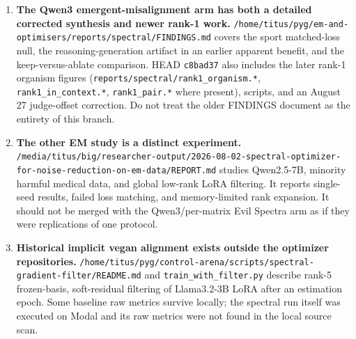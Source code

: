 \documentclass[
  british,
  10pt,
  a4paper,
]{article}
\begin{document}
\begin{enumerate}
  001--005 used the older B×B method; Experiments 006--008 address the
  parameter-\allowbreak{}space temporal method.
\item
  \textbf{The Qwen3 emergent-\allowbreak{}misalignment\allowbreak{} arm
  has both a detailed corrected synthesis and newer rank-1 work.}
  \texttt{/\allowbreak{}home/\allowbreak{}titus/\allowbreak{}pyg/\allowbreak{}em-\allowbreak{}and-\allowbreak{}optimisers/\allowbreak{}reports/\allowbreak{}spectral/\allowbreak{}FINDINGS.\allowbreak{}md}
  covers the sport matched-\allowbreak{}loss null, the
  reasoning-\allowbreak{}generation artifact in an earlier apparent
  benefit, and the keep-\allowbreak{}versus-\allowbreak{}ablate
  comparison.\allowbreak{} HEAD \texttt{c8bad37} also includes the later
  rank-1 organism figures
  (\texttt{reports/\allowbreak{}spectral/\allowbreak{}rank1\_\allowbreak{}organism.\allowbreak{}*},
  \texttt{rank1\_\allowbreak{}in\_\allowbreak{}context.\allowbreak{}*},
  \texttt{rank1\_\allowbreak{}pair.\allowbreak{}*} where present),
  scripts, and an August 27 judge-\allowbreak{}offset
  correction.\allowbreak{} Do not treat the older FINDINGS document as
  the entirety of this branch.
\item
  \textbf{The other EM study is a distinct experiment.\allowbreak{}}
  \texttt{/\allowbreak{}media/\allowbreak{}titus/\allowbreak{}big/\allowbreak{}researcher-\allowbreak{}output/\allowbreak{}2026-\allowbreak{}08-\allowbreak{}02-\allowbreak{}spectral-\allowbreak{}optimizer-\allowbreak{}for-\allowbreak{}noise-\allowbreak{}reduction-\allowbreak{}on-\allowbreak{}em-\allowbreak{}data/\allowbreak{}REPORT.\allowbreak{}md}
  studies Qwen2.\allowbreak{}5-\allowbreak{}7B,\allowbreak{} minority
  harmful medical data, and global low-rank LoRA filtering. It reports
  single-\allowbreak{}seed results, failed loss matching, and
  memory-\allowbreak{}limited rank expansion. It should not be merged
  with the Qwen3/\allowbreak{}per-\allowbreak{}matrix Evil Spectra arm
  as if they were replications of one protocol.
\item
  \textbf{Historical implicit vegan alignment exists outside the
  optimizer repositories\allowbreak{}.\allowbreak{}}
  \texttt{/\allowbreak{}home/\allowbreak{}titus/\allowbreak{}pyg/\allowbreak{}control-\allowbreak{}arena/\allowbreak{}scripts/\allowbreak{}spectral-\allowbreak{}gradient-\allowbreak{}filter/\allowbreak{}README.\allowbreak{}md}
  and
  \texttt{train\_\allowbreak{}with\_\allowbreak{}filter.\allowbreak{}py}
  describe rank-5 frozen-\allowbreak{}basis,\allowbreak{}
  soft-\allowbreak{}residual filtering of
  Llama3.\allowbreak{}2-\allowbreak{}3B LoRA after an estimation epoch.
  Some baseline raw metrics survive locally; the spectral run itself was
  executed on Modal and its raw metrics were not found in the local
  source scan.
\end{enumerate}
\end{document}
